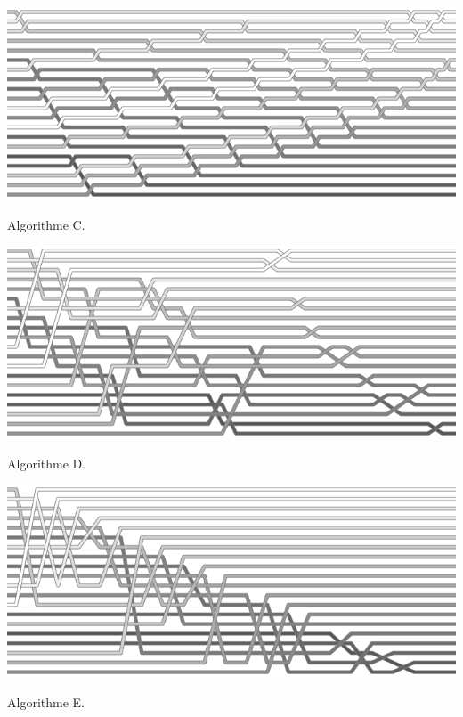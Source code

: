 \documentclass[10pt]{article}\usepackage[nu]{esial}
\begin{document}
\noindent\begin{minipage}{.49\linewidth}
  \includegraphics[width=\linewidth]{bubble.png}

  \centerline{Algorithme C.}
\end{minipage}\hfill\begin{minipage}{.49\linewidth}
  \includegraphics[width=\linewidth]{shell.png}

  \centerline{Algorithme D.}
\end{minipage}

\begin{center}
  \begin{minipage}{.49\linewidth}
    \includegraphics[width=\linewidth]{selection.png}

    \centerline{Algorithme E.}
  \end{minipage}
\end{center}
\end{document}
